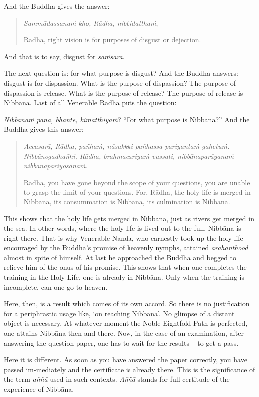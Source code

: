 And the Buddha gives the answer:

\begin{quote}
\emph{Sammādassanaṁ kho, Rādha, nibbidatthaṁ},

Rādha, right vision is for purposes of disgust or dejection.
\end{quote}

And that is to say, disgust for \emph{saṁsāra}.

The next question is: for what purpose is disgust? And the Buddha answers: disgust is for dispassion. What is the purpose of dispassion? The purpose of dispassion is release. What is the purpose of release? The purpose of release is Nibbāna. Last of all Venerable Rādha puts the question:

\emph{Nibbānaṁ pana, bhante, kimatthiyaṁ}? ``For what purpose is Nibbāna?'' And the Buddha gives this answer:

\begin{quote}
\emph{Accasarā, Rādha, pañhaṁ, nāsakkhi pañhassa pariyantaṁ gahetuṁ. Nibbānogadhañhi, Rādha, brahmacariyaṁ vussati, nibbānaparāyanaṁ nibbānapariyosānaṁ.}

Rādha, you have gone beyond the scope of your questions, you are unable to grasp the limit of your questions. For, Rādha, the holy life is merged in Nibbāna, its consummation is Nibbāna, its culmination is Nibbāna.
\end{quote}

This shows that the holy life gets merged in Nibbāna, just as rivers get merged in the sea. In other words, where the holy life is lived out to the full, Nibbāna is right there. That is why Venerable Nanda, who earnestly took up the holy life encouraged by the Buddha's promise of heavenly nymphs, attained \emph{arahanthood} almost in spite of himself. At last he approached the Buddha and begged to relieve him of the onus of his promise. This shows that when one completes the training in the Holy Life, one is already in Nibbāna. Only when the training is incomplete, can one go to heaven.

Here, then, is a result which comes of its own accord. So there is no justification for a periphrastic usage like, `on reaching Nibbāna'. No glimpse of a distant object is necessary. At whatever moment the Noble Eightfold Path is perfected, one attains Nibbāna then and there. Now, in the case of an examination, after answering the question paper, one has to wait for the results -- to get a pass.

Here it is different. As soon as you have answered the paper correctly, you have passed im-mediately and the certificate is already there. This is the significance of the term \emph{aññā} used in such contexts. \emph{Aññā} stands for full certitude of the experience of Nibbāna.


